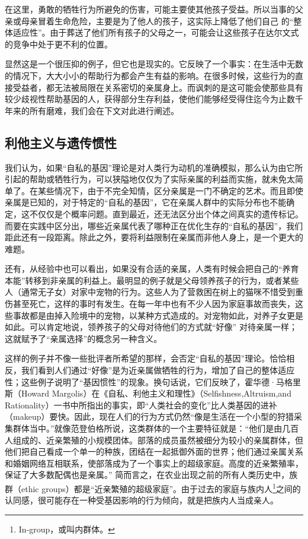 在这里，勇敢的牺牲行为所避免的伤害，可能主要使其他孩子受益。所以当事的父亲或母亲冒着生命危险，主要是为了他人的孩子，这实际上降低了他们自己 的“整体适应性”。由于葬送了他们所有孩子的父母之一，可能会让这些孩子在达尔文式的竞争中处于更不利的位置。

显然这是一个很压抑的例子，但它也是现实的。它反映了一个事实：在生活中无数的情况下，大大小小的帮助行为都会产生有益的影响。在很多时候，这些行为的直接受益者，都无法被局限在关系密切的亲属身上。而讽刺的是这可能会使那些具有较少歧视性帮助基因的人，获得部分生存利益，使他们能够经受得住迄今为止数千年来的所有磨难，我们会在下文对此进行阐述。

\subsection{利他主义与遗传惯性}

我们认为，如果“自私的基因”理论是对人类行为动机的准确模拟，那么认为由它所引起的帮助或牺牲行为，可以狭隘地仅仅为了实际亲属的利益而实施，就未免太简单了。在某些情况下，由于不完全知情，区分亲属是一门不确定的艺术。而且即使亲属是已知的，对于特定的“自私的基因”，它在亲属人群中的实际分布也不能确定，这不仅仅是个概率问题。直到最近，还无法区分出个体之间真实的遗传标记。而要在实践中区分出，哪些近亲属代表了哪种正在优化生存的“自私的基因”，我们距此还有一段距离。除此之外，要将利益限制在亲属而非他人身上，是一个更大的难题。

还有，从经验中也可以看出，如果没有合适的亲属，人类有时候会把自己的“养育本能”转移到非亲属的利益上。最明显的例子就是父母领养孩子的行为，或者某些人（通常无子女）对家中宠物的行为。这些人为了营救困在树上的猫咪不惜受到重伤甚至死亡，这样的事时有发生。在每一年中也有不少人因为家庭事故而丧失，这些事故都是由掉入险境中的宠物，以某种方式造成的。对宠物如此，对养子女更是如此。可以肯定地说，领养孩子的父母对待他们的方式就“好像” 对待亲属一样；这就赋予了“亲属选择”的概念另一种含义。

这样的例子并不像一些批评者所希望的那样，会否定“自私的基因”理论。恰恰相反，我们看到人们通过“好像”是为近亲属做牺牲的行为，增加了自己的整体适应性；这些例子说明了“基因惯性”的现象。换句话说，它们反映了，霍华德·马格里斯（Howard Margolis）在《自私、利他主义和理性》（Selfishness,Altruism,and Rationality）一书中所指出的事实，即“人类社会的变化”比人类基因的进补（makeup）要快。因此，现在人们的行为方式仍然“像是生活在一个小型的狩猎采集群体当中。”就像范登伯格所说，这类群体的一个主要特征就是：“他们是由几百人组成的、近亲繁殖的小规模团体。部落的成员虽然被细分为较小的亲属群体，但他们把自己看成一个单一的种族，团结在一起抵御外面的世界；他们通过亲属关系和婚姻网络互相联系，使部落成为了一个事实上的超级家庭。高度的近亲繁殖率，保证了大多数配偶也是亲属。” 简而言之，在农业出现之前的所有人类历史中，族群（ethic groups）都是“近亲繁殖的超级家庭”。由于过去的家庭与族内人\footnote{In-group，或叫内群体。}之间的认同感，很可能存在一种受基因影响的行为倾向，就是把族内人当成亲人。

